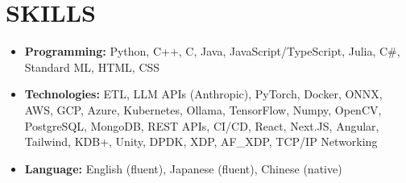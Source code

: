 \section*{SKILLS}
\begin{itemize}
  \item \textbf{Programming:} Python, C++, C, Java, JavaScript/TypeScript, Julia, C\#, Standard ML, HTML, CSS
  \item \textbf{Technologies:} ETL, LLM APIs (Anthropic), PyTorch, Docker, ONNX, AWS, GCP, Azure, Kubernetes, Ollama, TensorFlow, Numpy, OpenCV, PostgreSQL, MongoDB, REST APIs, CI/CD, React, Next.JS, Angular, Tailwind, KDB+, Unity, DPDK, XDP, AF\_XDP, TCP/IP Networking
  \item \textbf{Language:} English (fluent), Japanese (fluent), Chinese (native)
\end{itemize}
